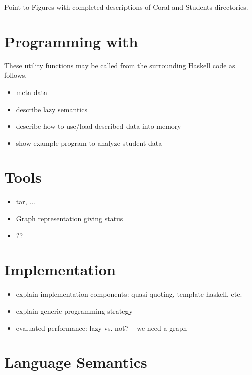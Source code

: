 \documentclass[natbib]{sigplanconf}
\begin{document}
Point to Figures with completed descriptions of Coral and Students directories.

\section{Programming with \forest{}}
\label{sec:exp}

These utility functions may be called from the surrounding Haskell code as follows.

\begin{itemize}
\item meta data
\item describe lazy semantics
\item describe how to use/load described data into memory
\item show example program to analyze student data
\end{itemize}

\section{Tools}
\label{sec:tools}
\begin{itemize}
\item tar, ...
\item Graph representation giving status
\item ??
\end{itemize}


\section{Implementation}

\begin{itemize}
\item explain implementation components: quasi-quoting, template haskell, etc.
\item explain generic programming strategy
\item evaluated performance: lazy vs. not? -- we need a graph
\end{itemize}

\section{Language Semantics}
\label{sec:exp}
\end{document}
